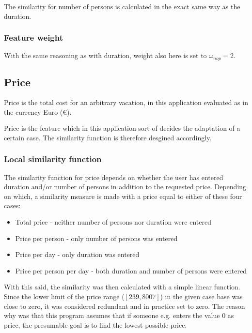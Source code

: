 \documentclass[12pt]{article}
\begin{document}
The similarity for number of persons is calculated in the exact same way as the duration. 

\subsubsection{Feature weight}
\label{sec:nop-weight}

With the same reasoning as with duration, weight also here is set to $\omega_{nop}=2$. 

\subsection{Price}
\label{sec:price}

Price is the total cost for an arbitrary vacation, in this application evaluated as in the currency Euro (\euro).

Price is the feature which in this application sort of decides the adaptation of a certain case. The similarity function is therefore desgined accordingly.

\subsubsection{Local similarity function}
\label{sec:price-sim}

The similarity function for price depends on whether the user has entered duration and/or number of persons in addition to the requested price. Depending on which, a similarity measure is made with a price equal to either of these four cases:

\begin{itemize}
\item Total price - neither number of persons nor duration were entered
\item Price per person - only number of persons was entered
\item Price per day - only duration was entered
\item Price per person per day - both duration and number of persons were entered
\end{itemize}

With this said, the similarity was then calculated with a simple linear function. Since the lower limit of the price range ($[239,8007]$) in the given case base was close to zero, it was considered redundant and in practice set to zero. The reason why was that this program assumes that if someone e.g. enters the value $0$ as price, the presumable goal is to find the lowest possible price. 
\end{document}
